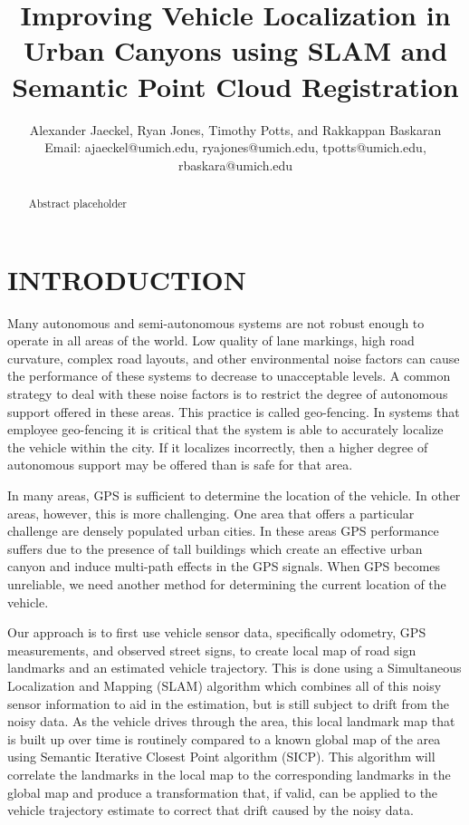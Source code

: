 \documentclass[letterpaper, 10 pt, conference]{ieeeconf}  %
\title{\LARGE \bf
Improving Vehicle Localization in Urban Canyons using SLAM and Semantic Point Cloud Registration
}
\author{Alexander Jaeckel, Ryan Jones, Timothy Potts, and Rakkappan Baskaran\\%
Email: ajaeckel@umich.edu, ryajones@umich.edu, tpotts@umich.edu, rbaskara@umich.edu
}
\begin{document}
\maketitle
\thispagestyle{empty}
\pagestyle{empty}


\begin{abstract}

Abstract placeholder

\end{abstract}


\section{INTRODUCTION}

Many autonomous and semi-autonomous systems are not robust enough to operate in all areas of the world. Low quality of lane markings, high road curvature, complex road layouts, and other environmental noise factors can cause the performance of these systems to decrease to unacceptable levels. A common strategy to deal with these noise factors is to restrict the degree of autonomous support offered in these areas. This practice is called geo-fencing. In systems that employee geo-fencing it is critical that the system is able to accurately localize the vehicle within the city. If it localizes incorrectly, then a higher degree of autonomous support may be offered than is safe for that area. 

In many areas, GPS is sufficient to determine the location of the vehicle. In other areas, however, this is more challenging. One area that offers a particular challenge are densely populated urban cities. In these areas GPS performance suffers due to the presence of tall buildings which create an effective urban canyon and induce multi-path effects in the GPS signals. When GPS becomes unreliable, we need another method for determining the current location of the vehicle.

Our approach is to first use vehicle sensor data, specifically odometry, GPS measurements, and observed street signs, to create local map of road sign landmarks and an estimated vehicle trajectory. This is done using a Simultaneous Localization and Mapping (SLAM) algorithm which combines all of this noisy sensor information to aid in the estimation, but is still subject to drift from the noisy data. As the vehicle drives through the area, this local landmark map that is built up over time is routinely compared to a known global map of the area using Semantic Iterative Closest Point algorithm (SICP). This algorithm will correlate the landmarks in the local map to the corresponding landmarks in the global map and produce a transformation that, if valid, can be applied to the vehicle trajectory estimate to correct that drift caused by the noisy data.
\end{document}
